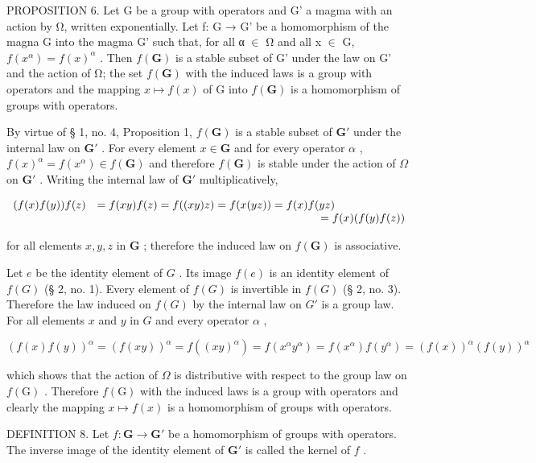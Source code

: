 PROPOSITION 6. Let G be a group with operators and G' a magma with an action by Ω, written exponentially. Let f: G → G' be a homomorphism of the magna G into the magma G' such that, for all α \ensuremath{\in} Ω and all x \ensuremath{\in} G, \(f(x^{\alpha}) = f(x)^{\alpha}\) . Then \(f(\mathbf{G})\) is a stable subset of G' under the law on G' and the action of Ω; the set \(f(\mathbf{G})\) with the induced laws is a group with operators and the mapping \(x \mapsto f(x)\) of G into \(f(\mathbf{G})\) is a homomorphism of groups with operators.

By virtue of § 1, no. 4, Proposition 1, \(f(\mathbf{G})\) is a stable subset of \(\mathbf{G}'\) under the internal law on \(\mathbf{G}'\) . For every element \(x \in \mathbf{G}\) and for every operator \(\alpha\) , \(f(x)^{\alpha} = f(x^{\alpha}) \in f(\mathbf{G})\) and therefore \(f(\mathbf{G})\) is stable under the action of \(\Omega\) on \(\mathbf{G}'\) . Writing the internal law of \(\mathbf{G}'\) multiplicatively,

\[
\begin{array}{r l} (f (x) f (y)) f (z) & = f (x y) f (z) = f ((x y) z) = f (x (y z)) = f (x) f (y z) \\ & \qquad \qquad \qquad \qquad \qquad \qquad \qquad \qquad \qquad \qquad = f (x) (f (y) f (z)) \end{array}
\]

for all elements \(x, y, z\) in \(\mathbf{G}\) ; therefore the induced law on \(f(\mathbf{G})\) is associative.

Let \(e\) be the identity element of \(G\) . Its image \(f(e)\) is an identity element of \(f(G)\) (§ 2, no. 1). Every element of \(f(G)\) is invertible in \(f(G)\) (§ 2, no. 3). Therefore the law induced on \(f(G)\) by the internal law on \(G'\) is a group law. For all elements \(x\) and \(y\) in \(G\) and every operator \(\alpha\) ,

\[
(f (x) f (y)) ^ {\alpha} = (f (x y)) ^ {\alpha} = f ((x y) ^ {\alpha}) = f \left(x ^ {\alpha} y ^ {\alpha}\right) = f \left(x ^ {\alpha}\right) f \left(y ^ {\alpha}\right) = (f (x)) ^ {\alpha} (f (y)) ^ {\alpha}
\]

which shows that the action of \(\Omega\) is distributive with respect to the group law on \(f(\mathrm{G})\) . Therefore \(f(\mathrm{G})\) with the induced laws is a group with operators and clearly the mapping \(x \mapsto f(x)\) is a homomorphism of groups with operators.

DEFINITION 8. Let \(f: \mathbf{G} \to \mathbf{G}'\) be a homomorphism of groups with operators. The inverse image of the identity element of \(\mathbf{G}'\) is called the kernel of \(f\) .


